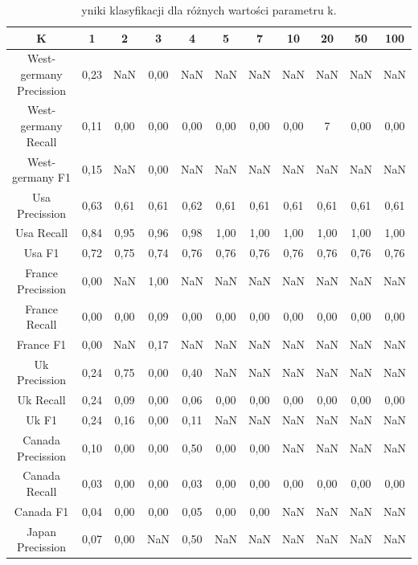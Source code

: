 \documentclass{classrep}
\begin{document}
\newpage
\begin{table}[h!]
\caption{yniki klasyfikacji dla różnych wartości parametru k.}
\centering
\vspace{0.1cm}
 \begin{tabular}{c c c c c c c c c c c}

    \textbf{K} & \textbf{1}   & \textbf{2}  & \textbf{3}  & \textbf{4}  & \textbf{5} & \textbf{7}   & \textbf{10}  & \textbf{20}  & \textbf{50}  & \textbf{100} \\

\hline
West-germany Precission 	& 0,23 & NaN & 0,00 & NaN  & NaN & NaN  & NaN & NaN & NaN  & NaN\\
West-germany Recall 		& 0,11 & 0,00 & 0,00 & 0,00 & 0,00 & 0,00 & 0,00 & 7 & 0,00 & 0,00\\
West-germany F1		& 0,15 & NaN & 0,00 & NaN  & NaN & NaN  & NaN & NaN & NaN  & NaN \\
\hline
Usa Precission 			& 0,63 & 0,61 & 0,61 & 0,62 & 0,61 & 0,61 & 0,61 & 0,61 & 0,61 & 0,61 \\
Usa Recall				& 0,84 & 0,95 & 0,96 & 0,98 & 1,00 & 1,00 & 1,00 & 1,00 & 1,00 & 1,00 \\
Usa F1			 	& 0,72 & 0,75 & 0,74 & 0,76 & 0,76 & 0,76 & 0,76 & 0,76 & 0,76 & 0,76 \\
\hline
France Precission 		& 0,00 & NaN & 1,00 & NaN  & NaN  & NaN & NaN & NaN  & NaN & NaN \\
France Recall 			& 0,00 & 0,00 & 0,09 & 0,00 & 0,00 & 0,00 & 0,00 & 0,00 & 0,00 & 0,00 \\
France F1 				& 0,00 & NaN & 0,17 & NaN  & NaN  & NaN & NaN & NaN  & NaN & NaN\\
\hline
Uk Precission 			& 0,24 & 0,75 & 0,00 & 0,40 & NaN  & NaN & NaN & NaN  & NaN & NaN\\
Uk Recall 				& 0,24 & 0,09 & 0,00 & 0,06 & 0,00 & 0,00 & 0,00 & 0,00 & 0,00 & 0,00\\
Uk F1 				& 0,24 & 0,16 & 0,00 & 0,11 & NaN  & NaN & NaN & NaN  & NaN & NaN \\
\hline
Canada Precission		& 0,10 & 0,00 & 0,00 & 0,50 & 0,00 & 0,00 & NaN & NaN  & NaN & NaN\\
Canada Recall 			& 0,03 & 0,00 & 0,00 & 0,03 & 0,00 & 0,00 & 0,00 & 0,00 & 0,00 & 0,00 \\
Canada F1 			& 0,04 & 0,00 & 0,00 & 0,05 & 0,00 & 0,00 & NaN &NaN  & NaN & NaN \\
\hline
Japan Precission 		& 0,07 & 0,00 & NaN & 0,50 & NaN  & NaN & NaN & NaN & NaN & NaN \\

\end{tabular}
\end{table}
\end{document}
